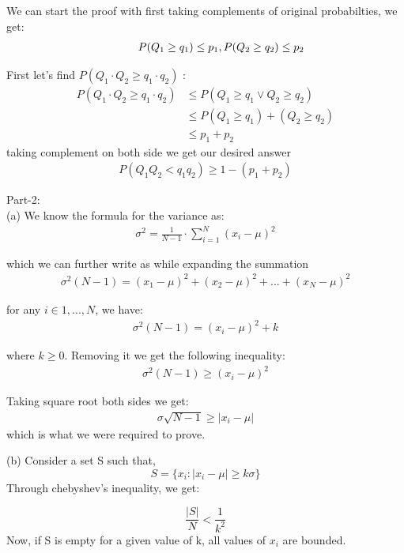 \documentclass[a4paper,12pt,answers]{exam}
\begin{document}
\begin{questions}
\begin{solution}
We can start the proof with first taking complements of original probabilties, we get:
\begin{align*}
    \hspace{10 mm} P(Q_1 \geq q_1) \leq p_1,  P(Q_2 \geq q_2) \leq p_2
\end{align*}

First let's find $P(Q_1\cdot Q_2 \geq q_1\cdot q_2)$ :
\begin{align*}
    P(Q_1\cdot Q_2 \geq q_1\cdot q_2) &\leq P(Q_1 \geq q_1 \vee Q_2 \geq q_2)
    \\&\leq P(Q_1 \geq q_1) + (Q_2 \geq q_2)
    \\&\leq p_1 + p_2
\end{align*}
taking complement on both side we get our desired answer
\begin{align*}
    P(Q_1 Q_2 < q_1 q_2) \geq 1 - (p_1 + p_2)
\end{align*}


Part-2:\\
(a) We know the formula for the variance as:
\begin{align*}
    \sigma^2 = \frac{1}{N-1} \cdot \sum_{i=1}^{N} (x_i - \mu)^2
\end{align*}

which we can further write as while expanding the summation
\begin{align*}
    \sigma^2 (N-1) = (x_1 - \mu)^2 + (x_2 - \mu)^2 + ... + (x_N - \mu)^2   
\end{align*}

for any $i \in {1,...,N}$, we have:
\begin{align*}
    \sigma^2 (N-1) = (x_i - \mu)^2 + k   
\end{align*}

where $k \geq 0$. Removing it we get the following inequality:
\begin{align*}
    \sigma^2 (N-1) \geq (x_i - \mu)^2
\end{align*}


Taking square root both sides we get:
\begin{align*}
    \sigma \sqrt{N-1} \geq |x_i - \mu|
\end{align*}
which is what we were required to prove.

(b) Consider a set S such that,
\[
    S = \{ x_i : |x_i - \mu| \geq k\sigma\}
\]
Through chebyshev's inequality, we get:

\[
    \frac{|S|}{N} < \frac{1}{k^2}
\]
Now, if S is empty for a given value of k, all values of $x_i$ are bounded.


\end{solution}
\end{questions}
\end{document}
